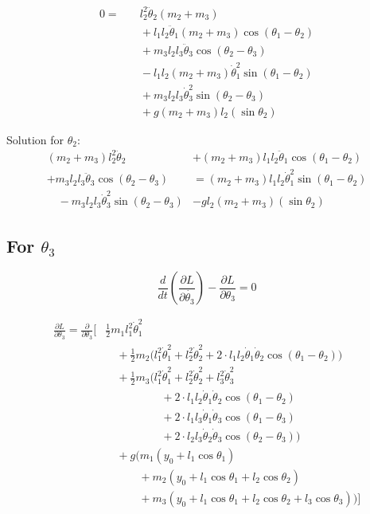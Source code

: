 \documentclass[11pt,a4paper]{article}
\begin{document}
\begin{align*}
    0 =&\quad l_2^2 \ddot{\theta}_2 (m_2 + m_3) \\
    &\quad + l_1 l_2 \ddot{\theta}_1 (m_2 + m_3) \cos(\theta_1 - \theta_2) \\
    &\quad + m_3 l_2 l_3 \ddot{\theta}_3 \cos(\theta_2 - \theta_3) \\
    &\quad - l_1 l_2 (m_2 + m_3)\dot{\theta}_1^2 \sin(\theta_1 - \theta_2) \\
    &\quad + m_3 l_2 l_3 \dot{\theta}_3^2 \sin(\theta_2 - \theta_3) \\
    &\quad + g (m_2 + m_3) l_2 (\sin\theta_2)
\end{align*}

Solution for $\theta_2$:
\begin{align*}
    (m_2 + m_3) l_2^2 \ddot{\theta}_2 &+ (m_2 + m_3) l_1 l_2 \ddot{\theta}_1 \cos(\theta_1 - \theta_2) \\
    + m_3 l_2 l_3 \ddot{\theta}_3 \cos(\theta_2 - \theta_3) &= (m_2 + m_3) l_1 l_2 \dot{\theta}_1^2 \sin(\theta_1 - \theta_2) \\
    \quad - m_3 l_2 l_3 \dot{\theta}_3^2 \sin(\theta_2 - \theta_3) &- g l_2 (m_2 + m_3) (\sin\theta_2)
\end{align*}

\subsection{For $\theta_3$}

\[ \frac{d}{dt} \left( \frac{\partial L}{\partial \dot{\theta_3}} \right) - \frac{\partial L}{\partial \theta_3} = 0 \]

\begin{align*}
    \frac{\partial L}{\partial \theta_3} = \frac{\partial}{\partial \theta_3} \Biggl[
    &\frac{1}{2} m_1 l_1^2 \dot{\theta}_1^2 \\
    &\quad + \frac{1}{2} m_2 \big( l_1^2 \dot{\theta}_1^2 + l_2^2 \dot{\theta}_2^2 + 2 \cdot l_1 l_2 \dot{\theta}_1 \dot{\theta}_2 \cos(\theta_1 - \theta_2) \big) \\
    &\quad + \frac{1}{2} m_3 \big( l_1^2 \dot{\theta}_1^2 + l_2^2 \dot{\theta}_2^2 + l_3^2 \dot{\theta}_3^2 \\
        &\qquad\qquad\quad + 2 \cdot l_1 l_2 \dot{\theta}_1 \dot{\theta}_2 \cos(\theta_1 - \theta_2) \\
        &\qquad\qquad\quad + 2 \cdot l_1 l_3 \dot{\theta}_1 \dot{\theta}_3 \cos(\theta_1 - \theta_3) \\
        &\qquad\qquad\quad + 2 \cdot l_2 l_3 \dot{\theta}_2 \dot{\theta}_3 \cos(\theta_2 - \theta_3) \big) \\
    &\quad + g \big( m_1 (y_0 + l_1 \cos\theta_1) \\
        &\qquad\quad + m_2 (y_0 + l_1 \cos\theta_1 + l_2 \cos\theta_2) \\
        &\qquad\quad + m_3 (y_0 + l_1 \cos\theta_1 + l_2 \cos\theta_2 + l_3 \cos\theta_3) \big) \Biggr]
\end{align*}
\end{document}

